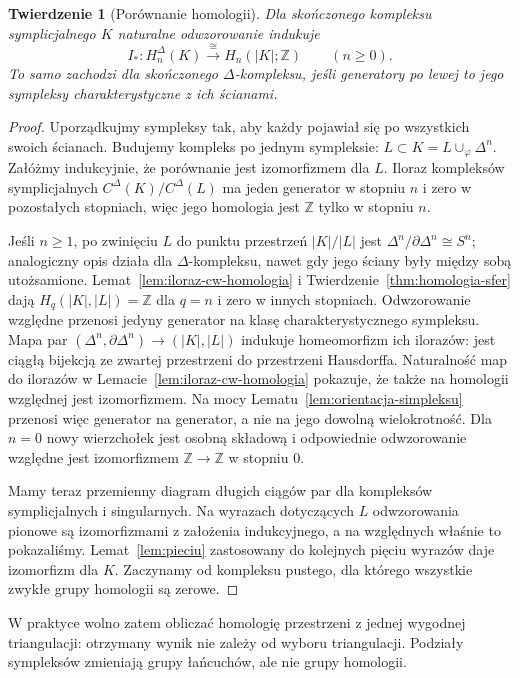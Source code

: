 \documentclass[11pt,a4paper,oneside]{report}
\newcommand{\Z}{\mathbb{Z}}
\theoremstyle{plain}
\newtheorem{twierdzenie}{Twierdzenie}[section]
\theoremstyle{definition}
\theoremstyle{remark}
\begin{document}
\begin{twierdzenie}[Porównanie homologii]
\label{thm:symplicjalna-singularna}
Dla skończonego kompleksu symplicjalnego
$K$ naturalne odwzorowanie indukuje
\[
 I_*:H_n^\Delta(K)\xrightarrow{\ \cong\ }
 H_n(|K|;\Z)
 \qquad(n\geq0).
\]
To samo zachodzi dla skończonego
$\Delta$-kompleksu, jeśli generatory
po lewej to jego sympleksy
charakterystyczne z ich ścianami.
\end{twierdzenie}
\begin{proof}
Uporządkujmy sympleksy tak, aby
każdy pojawiał się po wszystkich
swoich ścianach. Budujemy kompleks
po jednym sympleksie:
$L\subset K=L\cup_\varphi\Delta^n$.
Załóżmy indukcyjnie, że porównanie
jest izomorfizmem dla $L$.
Iloraz kompleksów symplicjalnych
$C^\Delta(K)/C^\Delta(L)$
ma jeden generator w stopniu $n$
i zero w pozostałych stopniach,
więc jego homologia jest $\Z$
tylko w stopniu $n$.

Jeśli $n\geq1$, po zwinięciu $L$
do punktu przestrzeń $|K|/|L|$
jest $\Delta^n/\partial\Delta^n
\cong S^n$; analogiczny opis
działa dla $\Delta$-kompleksu,
nawet gdy jego ściany były
między sobą utożsamione.
Lemat~\ref{lem:iloraz-cw-homologia}
i Twierdzenie~\ref{thm:homologia-sfer}
dają $H_q(|K|,|L|)=\Z$ dla
$q=n$ i zero w innych stopniach.
Odwzorowanie względne przenosi jedyny
generator na klasę charakterystycznego sympleksu.
Mapa par $(\Delta^n,\partial\Delta^n)\to(|K|,|L|)$
indukuje homeomorfizm ich ilorazów: jest ciągłą bijekcją
ze zwartej przestrzeni do przestrzeni Hausdorffa.
Naturalność map do ilorazów w Lemacie~\ref{lem:iloraz-cw-homologia}
pokazuje, że także na homologii względnej jest izomorfizmem.
Na mocy Lematu~\ref{lem:orientacja-simpleksu} przenosi więc
generator na generator, a nie na jego dowolną wielokrotność.
Dla $n=0$ nowy wierzchołek jest
osobną składową i odpowiednie
odwzorowanie względne jest izomorfizmem
$\Z\to\Z$ w stopniu $0$.

Mamy teraz przemienny diagram
długich ciągów par dla kompleksów
symplicjalnych i singularnych.
Na wyrazach dotyczących $L$
odwzorowania pionowe są izomorfizmami
z założenia indukcyjnego,
a na względnych właśnie
to pokazaliśmy. Lemat~\ref{lem:pieciu}
zastosowany do kolejnych pięciu
wyrazów daje izomorfizm dla $K$.
Zaczynamy od kompleksu pustego,
dla którego wszystkie zwykłe
grupy homologii są zerowe.
\end{proof}

W praktyce wolno zatem obliczać
homologię przestrzeni z jednej
wygodnej triangulacji: otrzymany
wynik nie zależy od wyboru
triangulacji. Podziały sympleksów
zmieniają grupy łańcuchów,
ale nie grupy homologii.
\end{document}
